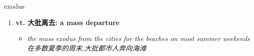 
\begin{frame}
{\huge exodus}
\begin{center}
\begin{enumerate}\Large
  \item \textbf{vt. 大批离去: a mass departure}
  \begin{itemize}
    \item \em{\Large{the mass exodus from the cities for the beaches on most summer weekends 在多数夏季的周末,大批都市人奔向海滩}}
  \end{itemize}
\end{enumerate}
\end{center}
\end{frame}
